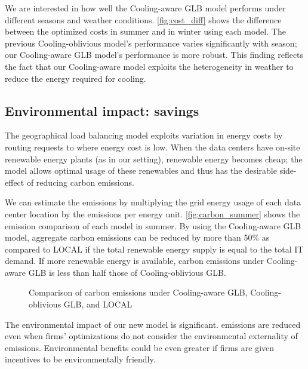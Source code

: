 \documentclass{acm_proc_article-sp}
\newcommand{\carbondioxide}{\ch{CO2}}
\begin{document}
We are interested in how well the Cooling-aware GLB model performs under different seasons and weather conditions. \autoref{fig:cost_diff} shows the difference between the optimized costs in summer and in winter using each model. The previous Cooling-oblivious model’s performance varies significantly with season; our Cooling-aware GLB model’s performance is more robust. This finding reflects the fact that our Cooling-aware model exploits the heterogeneity in weather to reduce the energy required for cooling.



\subsection{Environmental impact: \carbondioxide{} savings}
The geographical load balancing model exploits variation in energy costs by routing requests to where energy cost is low. When the data centers have on-site renewable energy plants (as in our setting), renewable energy becomes cheap; the model allows optimal usage of these renewables and thus has the desirable side-effect of reducing carbon emissions.

We can estimate the \carbondioxide{} emissions by multiplying the grid energy usage of each data center location by the \carbondioxide{} emissions per energy unit. \autoref{fig:carbon_summer} shows the \carbondioxide{} emission comparison of each model in summer. By using the Cooling-aware GLB model, aggregate carbon emissions can be reduced by more than 50\% as compared to LOCAL if the total renewable energy supply is equal to the total IT demand. If more renewable energy is available, carbon emissions under Cooling-aware GLB is less than half those of Cooling-oblivious GLB.

\begin{figure}
\centering
{}
\caption{Comparison of carbon emissions under Cooling-aware GLB, Cooling-oblivious GLB, and LOCAL}
\label{fig:carbon_summer}
\end{figure}

The environmental impact of our new model is significant. \carbondioxide{} emissions are reduced even when firms’ optimizations do not consider the environmental externality of \carbondioxide{} emissions. Environmental benefits could be even greater if firms are given incentives to be environmentally friendly.
\end{document}
